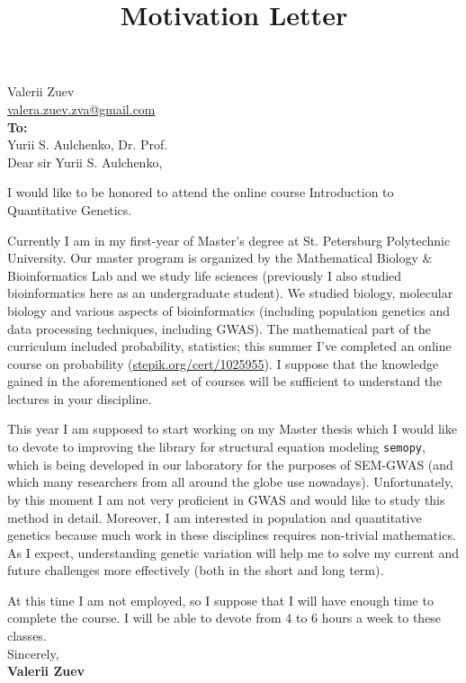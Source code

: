 \documentclass[a4paper,12pt]{article} %
\begin{document}
\title{Motivation Letter}
\date{}
\maketitle

\justifying
\thispagestyle{empty}

\noindent Valerii Zuev\\
\href{mailto:valera.zuev.zva@gmail.com}{valera.zuev.zva@gmail.com} \\

\noindent \textbf{To:} \\
Yurii S. Aulchenko, Dr. Prof. \\

Dear sir Yurii S. Aulchenko,

I would like to be honored to attend the online course Introduction to Quantitative Genetics.

Currently I am in my first-year of Master's degree at St. Petersburg Polytechnic University.
Our master program is organized by the Mathematical Biology \& Bioinformatics Lab and we study life sciences (previously I also studied bioinformatics here as an undergraduate student).
We studied biology, molecular biology and various aspects of bioinformatics (including population genetics and data processing techniques, including GWAS).
The mathematical part of the curriculum included probability, statistics; this summer I've completed an online course on probability (\href{https://stepik.org/cert/1025955}{stepik.org/cert/1025955}). I suppose that the knowledge gained in the aforementioned set of courses will be sufficient to understand the lectures in your discipline.

This year I am supposed to start working on my Master thesis which I would like to devote to improving the library for structural equation modeling \texttt{semopy}, which is being developed in our laboratory for the purposes of SEM-GWAS (and which many researchers from all around the globe use nowadays).
Unfortunately, by this moment I am not very proficient in GWAS and would like to study this method in detail.
Moreover, I am interested in population and quantitative genetics because much work in these disciplines requires non-trivial mathematics.
As I expect, understanding genetic variation will help me to solve my current and future challenges more effectively (both in the short and long term).

At this time I am not employed, so I suppose that I will have enough time to complete the course.
I will be able to devote from 4 to 6 hours a week to these classes. \\

\noindent Sincerely, \\
\textbf{Valerii Zuev}
\end{document}
